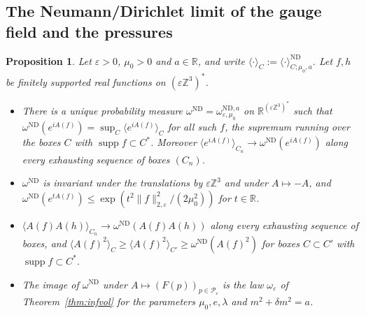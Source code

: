 \documentclass[11pt]{amsart}
\theoremstyle{plain}
\newtheorem{proposition}[theorem]{Proposition}
\theoremstyle{definition}
\theoremstyle{remark}
\numberwithin{equation}{section}
\newcommand{\R}{\mathbb{R}}
\newcommand{\Z}{\mathbb{Z}}
\newcommand{\eps}{\varepsilon}
\newcommand{\cP}{\mathcal{P}}
\newcommand{\norm}[1]{\lVert #1\rVert}
\newcommand{\ev}[1]{\langle #1\rangle}
\DeclareMathOperator{\supp}{supp}
\begin{document}
\subsection{The Neumann/Dirichlet limit of the gauge field and the pressures}

\begin{proposition}\label{prop:NDgauge}
Let $\eps>0$, $\mu_0>0$ and $a\in\R$, and write $\ev\cdot_C:=\ev\cdot^{\mathrm{ND}}_{C;\mu_0,a}$. Let $f,h$ be finitely supported real functions on $(\eps\Z^3)^*$.
\begin{itemize}
\item[(a)] There is a unique probability measure $\omega^{\mathrm{ND}}=\omega^{\mathrm{ND},a}_{\eps,\mu_0}$ on $\R^{(\eps\Z^3)^*}$ such that $\omega^{\mathrm{ND}}(e^{iA(f)})=\sup_C\ev{e^{iA(f)}}_C$ for all such $f$, the supremum running over the boxes $C$ with $\supp f\subset C^*$. Moreover $\ev{e^{iA(f)}}_{C_n}\to\omega^{\mathrm{ND}}(e^{iA(f)})$ along every exhausting sequence of boxes $(C_n)$.
\item[(b)] $\omega^{\mathrm{ND}}$ is invariant under the translations by $\eps\Z^3$ and under $A\mapsto-A$, and $\omega^{\mathrm{ND}}(e^{tA(f)})\le\exp(t^2\norm f^2_{2,\eps}/(2\mu_0^2))$ for $t\in\R$.
\item[(c)] $\ev{A(f)A(h)}_{C_n}\to\omega^{\mathrm{ND}}(A(f)A(h))$ along every exhausting sequence of boxes, and $\ev{A(f)^2}_C\ge\ev{A(f)^2}_{C'}\ge\omega^{\mathrm{ND}}(A(f)^2)$ for boxes $C\subset C'$ with $\supp f\subset C^*$.
\item[(d)] The image of $\omega^{\mathrm{ND}}$ under $A\mapsto(F(p))_{p\in\cP_\eps}$ is the law $\omega_\eps$ of Theorem~\ref{thm:infvol} for the parameters $\mu_0,e,\lambda$ and $m^2+\delta m^2=a$.
\end{itemize}
\end{proposition}
\end{document}
